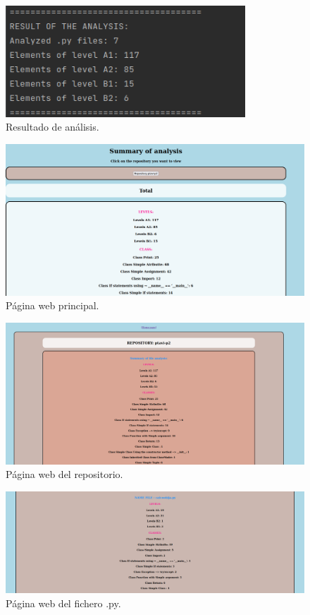 \documentclass[a4paper, 12pt]{book}
\begin{document}
\begin{figure}
  \centering
  \includegraphics[width=9cm, keepaspectratio]{img/ejemplousoana2.png}
  \caption{Resultado de análisis.}\label{fig:ana2}
\end{figure}

\begin{figure}
  \centering
  \includegraphics[width=1\textwidth]{img/ejemplousoana3.png}
  \caption{Página web principal.}\label{fig:ana3}
\end{figure}

\begin{figure}
  \centering
  \includegraphics[width=1\textwidth]{img/ejemplousoana4.png}
  \caption{Página web del repositorio.}\label{fig:ana4}
\end{figure}

\begin{figure}
  \centering
  \includegraphics[width=1\textwidth]{img/ejemplousoana5.png}
  \caption{Página web del fichero .py.}\label{fig:ana5}
\end{figure}
\end{document}
